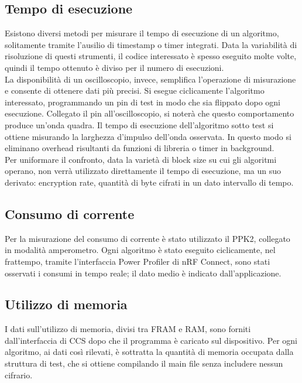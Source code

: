 \documentclass[target=bach,aauheader=,style=]{thud}
\begin{document}
		\subsection{Tempo di esecuzione}
		Esistono diversi metodi per misurare il tempo di esecuzione di un algoritmo, solitamente tramite l'ausilio di timestamp o timer integrati. Data la variabilità di risoluzione di questi strumenti, il codice interessato è spesso eseguito molte volte, quindi il tempo ottenuto è diviso per il numero di esecuzioni.\\
		La disponibilità di un oscilloscopio, invece, semplifica l'operazione di misurazione e consente di ottenere dati più precisi. Si esegue ciclicamente l'algoritmo interessato, programmando un pin di test in modo che sia flippato dopo ogni esecuzione. Collegato il pin all'oscilloscopio, si noterà che questo comportamento produce un'onda quadra. Il tempo di esecuzione dell'algoritmo sotto test si ottiene misurando la larghezza d'impulso dell'onda osservata. In questo modo si eliminano overhead risultanti da funzioni di libreria o timer in background.\\
		Per uniformare il confronto, data la varietà di block size su cui gli algoritmi operano, non verrà utilizzato direttamente il tempo di esecuzione, ma un suo derivato: encryption rate, quantità di byte cifrati in un dato intervallo di tempo.
		\subsection{Consumo di corrente}
		Per la misurazione del consumo di corrente è stato utilizzato il PPK2, collegato in modalità amperometro. Ogni algoritmo è stato eseguito ciclicamente, nel frattempo, tramite l'interfaccia Power Profiler di nRF Connect, sono stati osservati i consumi in tempo reale; il dato medio è indicato dall'applicazione.
		\subsection{Utilizzo di memoria}
		I dati sull'utilizzo di memoria, divisi tra FRAM e RAM, sono forniti dall'interfaccia di CCS dopo che il programma è caricato sul dispositivo. Per ogni algoritmo, ai dati così rilevati, è sottratta la quantità di memoria occupata dalla struttura di test, che si ottiene compilando il main file senza includere nessun cifrario.
\end{document}
